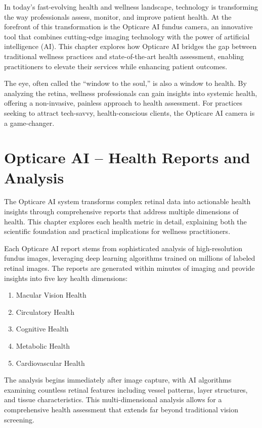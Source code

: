 \documentclass[
  Letterpaper,
]{scrbook}
\providecommand{\tightlist}{%
  \setlength{\itemsep}{0pt}\setlength{\parskip}{0pt}}\usepackage{longtable,booktabs,array}
\begin{document}
In today's fast-evolving health and wellness landscape, technology is
transforming the way professionals assess, monitor, and improve patient
health. At the forefront of this transformation is the Opticare AI
fundus camera, an innovative tool that combines cutting-edge imaging
technology with the power of artificial intelligence (AI). This chapter
explores how Opticare AI bridges the gap between traditional wellness
practices and state-of-the-art health assessment, enabling practitioners
to elevate their services while enhancing patient outcomes.

The eye, often called the ``window to the soul,'' is also a window to
health. By analyzing the retina, wellness professionals can gain
insights into systemic health, offering a non-invasive, painless
approach to health assessment. For practices seeking to attract
tech-savvy, health-conscious clients, the Opticare AI camera is a
game-changer.

\section{Opticare AI -- Health Reports and
Analysis}\label{opticare-ai-health-reports-and-analysis}

The Opticare AI system transforms complex retinal data into actionable
health insights through comprehensive reports that address multiple
dimensions of health. This chapter explores each health metric in
detail, explaining both the scientific foundation and practical
implications for wellness practitioners.

Each Opticare AI report stems from sophisticated analysis of
high-resolution fundus images, leveraging deep learning algorithms
trained on millions of labeled retinal images. The reports are generated
within minutes of imaging and provide insights into five key health
dimensions:

\begin{enumerate}
\def\labelenumi{\arabic{enumi}.}
\tightlist
\item
  Macular Vision Health
\item
  Circulatory Health
\item
  Cognitive Health
\item
  Metabolic Health
\item
  Cardiovascular Health
\end{enumerate}

The analysis begins immediately after image capture, with AI algorithms
examining countless retinal features including vessel patterns, layer
structures, and tissue characteristics. This multi-dimensional analysis
allows for a comprehensive health assessment that extends far beyond
traditional vision screening.
\end{document}

